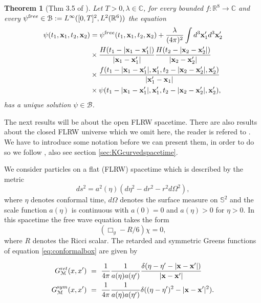 \documentclass[b5paper,draft,openbib,12pt]{memoir}
\newtheorem{Thm}[Def]{Theorem}
\newcommand{\vx}{\mathbf{x}}
\newcommand{\ret}{{\textup ret}}
\newcommand{\sym}{{\textup sym}}
\newcommand{\free}{{\textup free}}
\begin{document}
\begin{Thm}[Thm 3.5 of \cite{mtve}]
  Let \(T>0, \lambda\in\mathbb{C}\), for every 
  bounded \(f:\mathbb{R}^8\rightarrow \mathbb{C}\) 
  and every \(\psi^\free \in \mathcal{B}:=L^\infty([0,T]^2,L^2(\mathbb{R}^6))\) the equation
\begin{align*}
\psi(t_1,\vx_1,t_2,\vx_2)&=\psi^\free(t_1,\vx_1,t_2,\vx_2) + \frac{\lambda}{(4\pi)^2}\int d^3\vx_1'd^3\vx_2'\\
& \times \frac{H(t_1-|\vx_1-\vx_1'|)}{|\vx_1-\vx_1'|} \frac{H(t_2-|\vx_2-\vx_2'|)}{|\vx_2-\vx_2'|}\\
&\times  \frac{f(t_1-|\vx_1-\vx_1'|,\vx_1',t_2-|\vx_2-\vx_2'|,\vx_2')}{|\vx_1'-\vx_1|}\\
& \times \psi(t_1-|\vx_1-\vx_1'|,\vx_1',t_2-|\vx_2-\vx_2'|,\vx_2'),
\end{align*}
has a unique solution \(\psi\in\mathcal{B}\).
\end{Thm}


The next results will be about the open FLRW spacetime.
There are also results about the closed
FLRW universe which we omit here, the reader is refered
to \cite[Thm 4.3]{lienertcurved}.
We have to introduce some notation before we can 
present them, in order to do so we follow \cite[sec 3.3]{selfKG},
also see section \ref{sec:KGcurvedspacetime}. 


We consider particles on a flat (FLRW) spacetime which is 
described by the metric
\begin{equation}
	ds^2 = a^2(\eta) \left( d\eta^2 - dr^2 - r^2 d \Omega^2 \right),
\end{equation}
where $\eta$ denotes conformal time, $d \Omega$ denotes the 
surface measure on $\mathbb{S}^2$ and the scale function 
$a(\eta)$ is 
 continuous with $a(0) = 0$ 
and $a(\eta) > 0$ for $\eta >0$.
In this spacetime the free wave equation takes the form 
\begin{equation}
	\left( \Box_g - R/6 \right) \chi = 0,
	\label{eq:conformalbox}
\end{equation}
where $R$ denotes the Ricci scalar.
The retarded and 
symmetric Greens functions of equation \eqref{eq:conformalbox}
are given by

\begin{align}
	G_{\mathcal{M}}^\ret(x,x') ~&=~ \frac{1}{4\pi} \frac{1}{a(\eta) a(\eta')} \frac{\delta(\eta - \eta' -|\vx-\vx'|)}{|\vx-\vx'|}\nonumber\\
G_{\mathcal{M}}^\sym(x,x') ~&=~ \frac{1}{4\pi} \frac{1}{a(\eta) a(\eta')} \delta((\eta-\eta')^2-|\vx-\vx'|^2).
\end{align}
\end{document}
